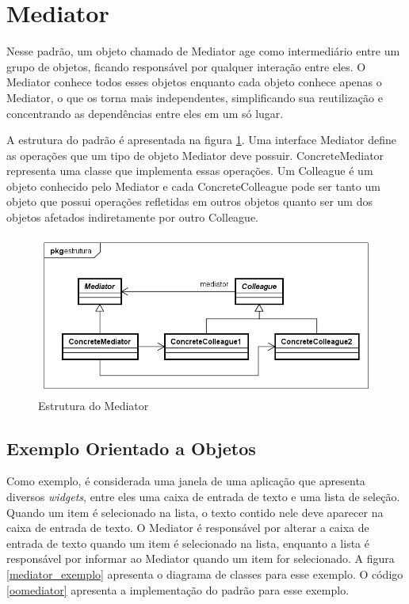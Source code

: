 \section{Mediator}


Nesse padrão, um objeto chamado de Mediator age como intermediário 
entre um grupo de objetos, ficando responsável por qualquer 
interação entre eles. O Mediator conhece todos 
esses objetos enquanto cada objeto conhece apenas o 
Mediator, o que os torna 
mais independentes, simplificando sua reutilização
 e concentrando as dependências entre eles 
em um só lugar. 

A estrutura do padrão é apresentada na figura \ref{mediator_struct}. 
Uma interface Mediator define as operações que um tipo de 
objeto Mediator deve possuir. ConcreteMediator representa 
uma classe que implementa essas operações. Um Colleague 
é um objeto conhecido pelo Mediator e cada ConcreteColleague 
pode ser tanto um objeto que possui operações refletidas 
em outros objetos quanto ser um dos objetos afetados 
indiretamente por outro Colleague.

\begin{figure}[htb]
	\caption{\label{mediator_struct}Estrutura do Mediator}
	\begin{center}
	    \includegraphics[scale=0.5]{5_padroes-contexto-funcional/5.3_comportamentais/5.3.05_mediator/mediator_estrutura.png}
	\end{center}
\end{figure}

\subsection*{Exemplo Orientado a Objetos}

Como exemplo, é considerada uma janela de uma aplicação 
que apresenta diversos \textit{widgets}, entre eles uma caixa 
de entrada de texto e uma lista de seleção. Quando um item é 
selecionado na lista, o texto contido nele deve aparecer 
na caixa de entrada de texto. O Mediator é responsável 
por alterar a caixa de entrada de texto quando um item 
é selecionado na lista, enquanto a lista é responsável 
por informar ao Mediator quando um item for selecionado. 
A figura \ref{mediator_exemplo} apresenta o diagrama 
de classes para esse exemplo. O código \ref{oomediator} 
apresenta a implementação do padrão para esse exemplo.

